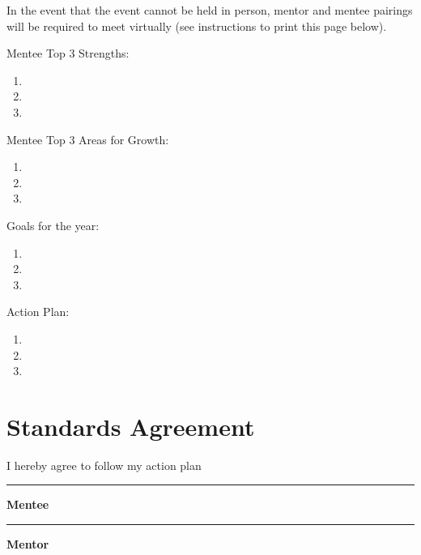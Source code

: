 \documentclass[
  openany]{book}
\begin{document}
In the event that the event cannot be held in person, mentor and mentee pairings will be required to meet virtually (see instructions to print this page below).

Mentee Top 3 Strengths:

\begin{enumerate}
\def\labelenumi{\arabic{enumi}.}
\item
\item
\item
\end{enumerate}

Mentee Top 3 Areas for Growth:

\begin{enumerate}
\def\labelenumi{\arabic{enumi}.}
\item
\item
\item
\end{enumerate}

Goals for the year:

\begin{enumerate}
\def\labelenumi{\arabic{enumi}.}
\item
\item
\item
\end{enumerate}

Action Plan:

\begin{enumerate}
\def\labelenumi{\arabic{enumi}.}
\item
\item
\item
\end{enumerate}

\hypertarget{standards-agreement}{%
\section{Standards Agreement}\label{standards-agreement}}

I hereby agree to follow my action plan\\

\begin{center}\rule{0.5\linewidth}{0.5pt}\end{center}

\textbf{Mentee}

\begin{center}\rule{0.5\linewidth}{0.5pt}\end{center}

\textbf{Mentor}
\end{document}
